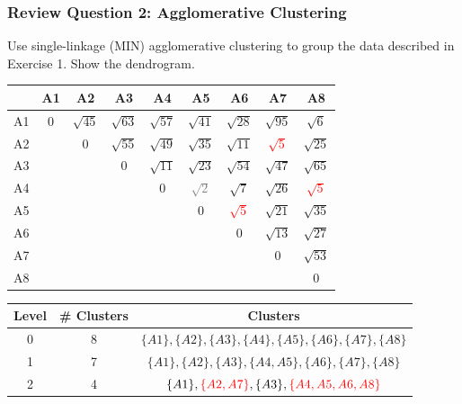 \documentclass[aspectratio=169, 10pt]{beamer}
\begin{document}
\begin{frame}[t]
    \frametitle{Review Question 2: Agglomerative Clustering}
    \small
    Use single-linkage (MIN) agglomerative clustering to group the data described in Exercise 1. Show the dendrogram.
    \begin{table}[]
        \scriptsize
        \begin{tabular}{c|cccccccc}
           & A1 & A2 & A3 & A4 & A5 & A6 & A7 & A8 \\ \hline
        A1 & $0$  & $\sqrt{45}$ & $\sqrt{63}$ & $\sqrt{57}$ & $\sqrt{41}$ & $\sqrt{28}$ & $\sqrt{95}$ & $\sqrt{6}$ \\
        A2 &    & $0$  & $\sqrt{55}$ & $\sqrt{49}$ & $\sqrt{35}$ & $\sqrt{11}$ & \textcolor{red}{$\sqrt{5}$}  & $\sqrt{25}$ \\
        A3 &    &    & $0$  & $\sqrt{11}$ & $\sqrt{23}$ & $\sqrt{54}$ & $\sqrt{47}$ & $\sqrt{65}$ \\ 
        A4 &    &    &    & $0$  & \textcolor{gray}{$\sqrt{2}$} & $\sqrt{7}$  & $\sqrt{26}$ & \textcolor{red}{$\sqrt{5}$}  \\
        A5 &    &    &    &    & $0$  & \textcolor{red}{$\sqrt{5}$}  & $\sqrt{21}$ & $\sqrt{35}$ \\
        A6 &    &    &    &    &    & $0$  & $\sqrt{13}$ & $\sqrt{27}$ \\
        A7 &    &    &    &    &    &    & $0$  & $\sqrt{53}$ \\
        A8 &    &    &    &    &    &    &    & $0$ \\
        \end{tabular}
    \end{table}

    \begin{table}[]
        \scriptsize
        \begin{tabular}{c|c|c}
        Level & \# Clusters & Clusters \\ \hline
        0     & 8           & $\{A1\}, \{A2\}, \{A3\}, \{A4\}, \{A5\}, \{A6\}, \{A7\}, \{A8\}$\\
        1     & 7           & $\{A1\}, \{A2\}, \{A3\}, \{A4, A5\}, \{A6\}, \{A7\}, \{A8\}$\\
        2     & 4           & $\{A1\}, \textcolor{red}{\{A2, A7\}}, \{A3\}, \textcolor{red}{\{A4, A5, A6,A8\}}$\\
        \end{tabular}
    \end{table}

\end{frame}
\end{document}
